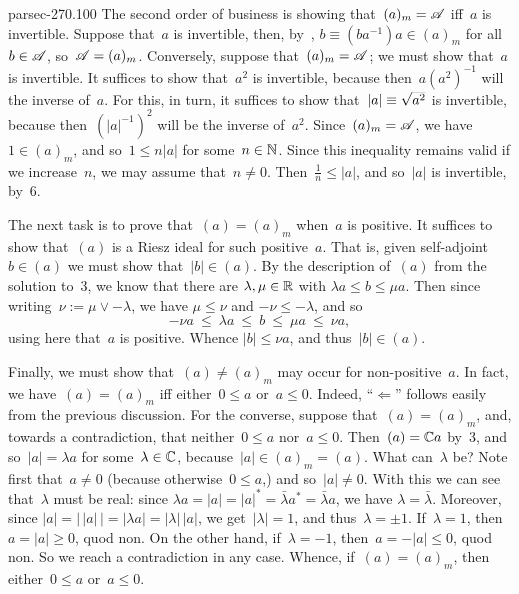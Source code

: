 \documentclass[b5page]{book}
\begin{document}
\begin{solution}{parsec-270.100}
The second order of business
is showing that~$(a)_m=\mathscr{A}$ iff~$a$ is invertible.
Suppose that~$a$ is invertible,
then, by~,
$b\equiv (ba^{-1})a\in (a)_m$
for all~$b\in\mathscr{A}$, so~$\mathscr{A}=(a)_m$.
Conversely, suppose that~$(a)_m=\mathscr{A}$;
we must show that~$a$ is invertible.
It suffices to show that~$a^2$ is invertible,
because then~$a (a^2)^{-1}$ will the inverse of~$a$.
For this, in turn,
it suffices to show that~$\left|a\right|\equiv \smash{\sqrt{a^2}}$
is invertible,
because then~$(\left|a\right|^{-1})^2$
will be the inverse of~$a^2$.
Since~$(a)_m=\mathscr{A}$,
we have~$1\in(a)_m$,
and so~$1\leq n\left|a\right|$ for some~$n\in \mathbb{N}$.
Since this inequality remains valid if we increase~$n$,
we may assume that~$n\neq 0$.
Then~$\frac{1}{n} \leq \left|a\right|$,
and so~$\left|a\right|$ is invertible,
by~6.

The next task is to prove that~$(a)=(a)_m$ when~$a$ is positive.
It suffices to show that~$(a)$ is a Riesz ideal for such positive~$a$.
That is, given self-adjoint $b\in (a)$ we must show 
that~$\left|b\right|\in(a)$.
By the description of~$(a)$ 
from the solution to~3,
we know that there are $\lambda,\mu\in \mathbb{R}$ with
$\lambda a \leq b\leq \mu a$.
Then since writing~$\nu:= \mu\vee -\lambda$,
we have $\mu\leq \nu$ and $-\nu\leq -\lambda$,
and so
$$-\nu a \ \leq\  \lambda a \ \leq\  b\ \leq\  
\mu a\ \leq\  \nu a,$$ using here that~$a$ is positive.
Whence $\left|b\right|\leq \nu a$,
and thus~$\left|b\right| \in (a)$.

Finally,
we must show that~$(a)\neq (a)_m$ may occur for non-positive~$a$.
In fact,
we have~$(a)=(a)_m$ iff either~$0\leq a$ or~$a\leq 0$.
Indeed,
``$\Longleftarrow$'' follows easily from the previous discussion.
For the converse,
suppose that~$(a)=(a)_m$,
and, towards a contradiction,
that neither~$0\leq a$ nor~$a\leq 0$.
Then~$(a)=\mathbb{C} a$
by~3,
and so~$\left|a\right|=\lambda a$ for some~$\lambda\in \mathbb{C}$,
because~$\left|a\right| \in (a)_m=(a)$.
What can~$\lambda$ be?
Note first that~$a\neq 0$ (because otherwise~$0\leq a$,)
and so~$\left|a\right| \neq 0$.
With this we can see that~$\lambda$ must be real:
since
$\lambda a = \left|a\right| = \left|a\right|^* = \bar\lambda a^*
=\bar\lambda a$,
we have $\lambda=\bar\lambda$.
Moreover,
since $\left|a\right|=\left|\,\left|a\right|\,\right|
= \left|\lambda a\right| = \left| \lambda\right|\,\left|a \right|$,
we get~$\left|\lambda\right| = 1$,
and thus~$\lambda = \pm 1$.
If~$\lambda =1$,
then~$a = \left|a\right|\geq 0$, quod non.
On the other hand,
if~$\lambda=-1$,
then~$a=-\left|a\right|\leq 0$, quod non.
So we reach a contradiction in any case.
Whence, if~$(a)=(a)_m$,
then either~$0\leq a$ or~$a\leq 0$.
\end{solution}
\end{document}
